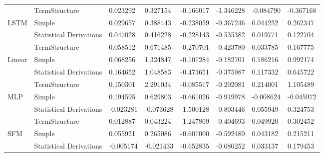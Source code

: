 \documentclass[10pt,letterpaper]{article}
\begin{document}
\begin{table}[!ht]
\begin{adjustwidth}{-2.25in}{0in}
\begin{tabular}{llp{2cm}p{2cm}p{2cm}p{2cm}p{2cm}p{2cm}}
    & TermStructure &                 0.023292 &                 0.327154 &           -0.166017 &                -1.346228 &                     -0.084790 &                     -0.367168 \\
LSTM & Simple &                 0.029657 &                 0.388443 &           -0.238059 &                -0.367246 &                      0.044252 &                      0.262347 \\
    & Statistical Derivations &                 0.047028 &                 0.416228 &           -0.228143 &                -0.535382 &                      0.019771 &                      0.122704 \\
    & TermStructure &                 0.058512 &                 0.671485 &           -0.270701 &                -0.423780 &                      0.033785 &                      0.167775 \\
Linear & Simple &                 0.068256 &                 1.324847 &           -0.107284 &                -0.182701 &                      0.186216 &                      0.992174 \\
    & Statistical Derivations &                 0.164652 &                 1.048583 &           -0.473651 &                -0.375987 &                      0.117332 &                      0.645722 \\
    & TermStructure &                 0.150301 &                 2.291034 &           -0.085517 &                -0.202081 &                      0.214001 &                      1.105489 \\
MLP & Simple &                 0.194595 &                 0.629803 &           -0.661026 &                -0.919978 &                     -0.008624 &                     -0.045972 \\
    & Statistical Derivations &                -0.023281 &                -0.073628 &           -1.500128 &                -0.803446 &                      0.055949 &                      0.324753 \\
    & TermStructure &                 0.012887 &                 0.043224 &           -1.247869 &                -0.404693 &                      0.049920 &                      0.302452 \\
SFM & Simple &                 0.055921 &                 0.265086 &           -0.607000 &                -0.592480 &                      0.043182 &                      0.215211 \\
    & Statistical Derivations &                -0.005174 &                -0.021433 &           -0.652835 &                -0.680252 &                      0.033137 &                      0.179453 \\

\end{tabular}
\end{adjustwidth}
\end{table}
\end{document}
